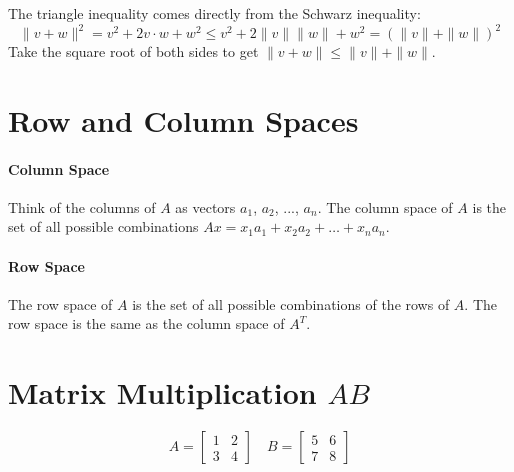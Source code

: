 \noindent The triangle inequality comes directly from the Schwarz inequality:
\[
	\|v + w \|^{2} = v^{2} + 2v \cdot w + w^{2} \leq v^2 + 2\|v\|\|w\| + w^2 = (\|v\| + \|w\|)^{2}
\] Take the square root of both sides to get $\|v + w\| \leq \|v\| + \|w\|$.

\section{Row and Column Spaces}


\paragraph{Column Space}
Think of the columns of $A$ as vectors $a_1$, $a_2$, ..., $a_n$. The column space of $A$ is the set of all possible combinations $Ax = x_1a_1 + x_2a_2 + \ldots + x_na_n$.

\paragraph{Row Space} The row space of $A$ is the set of all possible combinations of the rows of $A$. The row space is the same as the column space of $A^T$.

\section{Matrix Multiplication $AB$}

\[
	A = \begin{bmatrix}
		1 & 2 \\
		3 & 4
	\end{bmatrix} \quad
	B= \begin{bmatrix}
		5 & 6 \\
		7 & 8
	\end{bmatrix}
\]

